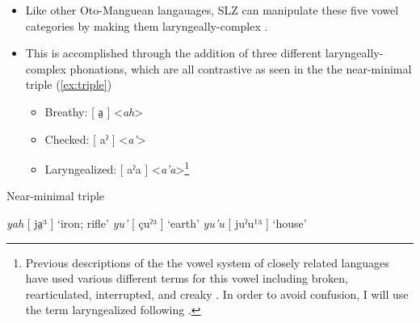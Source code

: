 \documentclass[12pt, letterpaper]{article}
\begin{document}
\begin{itemize}
	\item Like other Oto-Manguean langauages, SLZ can manipulate these five vowel categories by making them laryngeally-complex \citep{silvermanLaryngealComplexityOtomanguean1997}.

	\item This is accomplished through the addition of three different laryngeally-complex phonations, which are all contrastive as seen in the the near-minimal triple (\ref{ex:triple})
		\begin{itemize}
			\item Breathy: [ a̤ ] <\textit{ah}> 
			\item Checked: [ aˀ ] <\textit{a'}>
			\item Laryngealized: [ aˀa ] <\textit{a'a}>\footnote{Previous descriptions of the the vowel system of closely related languages have used various different terms for this vowel including broken, rearticulated, interrupted, and creaky \citep{longDiccionarioZapotecoSan2005,avelinoAcousticElectroglottographicAnalyses2010,avelinobecerraTopicsYalalagZapotec2004,sonnenscheinDescriptiveGrammarSan2005,adlerAcousticsPhonationTypes2016}. In order to avoid confusion, I will use the term laryngealized following \citet{avelinoAcousticElectroglottographicAnalyses2010}.}
		\end{itemize}
\end{itemize}

\begin{exe}
	\ex \label{ex:triple} Near-minimal triple
	\begin{xlist} 
		\ex \textit{yah} [ ja̤³ ] `iron; rifle'
		\ex \textit{yu'} [ çuˀ³ ] `earth'
		\ex \textit{yu'u} [ juˀu¹³ ] `house' 
	\end{xlist} 
\end{exe} 
\end{document}

